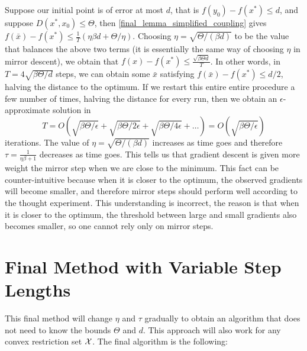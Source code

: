 Suppose our initial point is of error at most $d$, that is $f (y_0 ) - f (x^\ast ) \leq d$, and suppose $D(x^\ast, {x_0}) \leq \Theta$, then \eqref{final_lemma_simplified_coupling} gives $f (\bar{x})-f (x^\ast ) \leq \frac{1}{T}\left( \eta \beta d + \Theta/\eta\right)$. Choosing $\eta = \sqrt{\Theta/(\beta d)}$ to be the value that balances the above two terms (it is essentially the same way of choosing $\eta$ in mirror descent), we obtain that $f (x) - f (x^\ast ) \leq \frac{\sqrt{\beta \Theta d}}{T}$. In other words, in $T = 4 \sqrt{\beta\Theta/d}$ steps, we can obtain some $\bar{x}$ satisfying $f (\bar{x}) - f (x^\ast ) \leq d/2$, halving the distance to the optimum. If we restart this entire entire procedure a few number of times, halving the distance for every run, then we obtain an $\epsilon$-approximate solution in
\[
    T = O \left(\sqrt{\beta \Theta / \epsilon} + \sqrt{\beta \Theta / 2\epsilon} + \sqrt{\beta \Theta / 4 \epsilon} + \dots \right) = O\left(\sqrt{\beta\Theta / \epsilon}  \right)
\]
iterations. The value of $\eta = \sqrt{\Theta/(\beta d)}$ increases as time goes and therefore $\tau = \frac{1}{\eta \beta +1}$ decreases as time goes. This tells us that gradient descent is given more weight the mirror step when we are close to the minimum.  This fact can be counter-intuitive because when it is closer to the optimum, the observed gradients will become smaller, and therefore mirror steps should perform well according to the thought experiment. This understanding is incorrect, the reason is that when it is closer to the optimum, the threshold between large and small gradients also becomes smaller, so one cannot rely only on mirror steps.

\section{Final Method with Variable Step Lengths}
This final method will change $\eta$ and $\tau$ gradually to obtain an algorithm that does not need to know the bounds $\Theta$ and $d$. This approach will also work for any convex restriction set $\mathcal{X}$. The final algorithm is the following:

